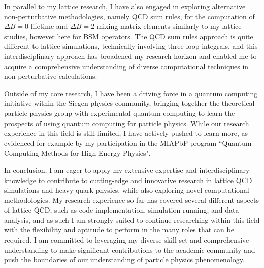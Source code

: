 \documentclass[11pt, a4paper]{awesome-cv}
\begin{document}
\begin{cvletter}
In parallel to my lattice research, I have also engaged in exploring alternative non-perturbative methodologies, namely QCD sum rules, for the computation of $\Delta B=0$ lifetime and $\Delta B=2$ mixing matrix elements similarly to my lattice studies, however here for BSM operators.
The QCD sum rules approach is quite different to lattice simulations, technically involving three-loop integrals, and this interdisciplinary approach has broadened my research horizon and enabled me to acquire a comprehensive understanding of diverse computational techniques in non-perturbative calculations.

Outside of my core research, I have been a driving force in a quantum computing initiative within the Siegen physics community, bringing together the theoretical particle physics group with experimental quantum computing to learn the prospects of using quantum computing for particle physics. 
While our research experience in this field is still limited, I have actively pushed to learn more, as evidenced for example by my participation in the MIAPbP program ``Quantum Computing Methods for High Energy Physics".

In conclusion, I am eager to apply my extensive expertise and interdisciplinary knowledge to contribute to cutting-edge and innovative research in lattice QCD simulations and heavy quark physics, while also exploring novel computational methodologies. 
My research experience so far has covered several different aspects of lattice QCD, such as code implementation, simulation running, and data analysis, and as such I am strongly suited to continue researching within this field with the flexibility and aptitude to perform in the many roles that can be required.
I am committed to leveraging my diverse skill set and comprehensive understanding to make significant contributions to the academic community and push the boundaries of our understanding of particle physics phenomenology.

\end{cvletter}

\makeletterclosing
\end{document}
